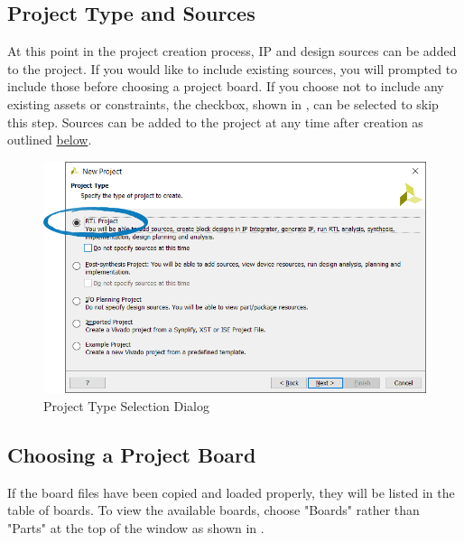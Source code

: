 \subsection{Project Type and Sources}
At this point in the project creation process, IP and design sources can be added to the project. If you would like to include existing sources, you will prompted to include those before choosing a project board. If you choose not to include any existing assets or constraints, the  checkbox, shown in , can be selected to skip this step. Sources can be added to the project at any time after creation as outlined \hyperref[sub:addsources]{below}.

\begin{figure}
	\centering
	\includegraphics{images/vivado/new_rtl_project.png}
	\caption{Project Type Selection Dialog}
	\label{fig:newprojecttype}
\end{figure}


\subsection{Choosing a Project Board}

If the board files have been copied and loaded properly, they will be listed in the table of boards. To view the available boards, choose "Boards" rather than "Parts" at the top of the window as shown in . \\


